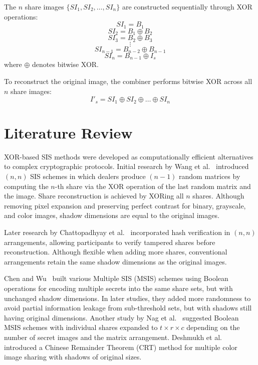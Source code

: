 The $n$ share images $\{SI_1, SI_2, \dots, SI_n\}$ are constructed sequentially through XOR operations:
\begin{equation}
SI_1 = B_1
\end{equation}
\begin{equation}
SI_2 = B_1 \oplus B_2
\end{equation}
\begin{equation}
SI_3 = B_2 \oplus B_3
\end{equation}
\begin{equation}
\vdots
\end{equation}
\begin{equation}
SI_{n-1} = B_{n-2} \oplus B_{n-1}
\end{equation}
\begin{equation}
SI_n = B_{n-1} \oplus I_s
\end{equation}
where $\oplus$ denotes bitwise XOR.

To reconstruct the original image, the combiner performs bitwise XOR across all $n$ share images:
\begin{equation}
I'_s = SI_1 \oplus SI_2 \oplus \dots \oplus SI_n
\end{equation}


\section{Literature Review}
\label{sec:lad-litreview}


XOR-based SIS methods were developed as computationally efficient alternatives to complex cryptographic protocols. Initial research by Wang et al.~\cite{wang2007} introduced $(n, n)$ SIS schemes in which dealers produce $(n-1)$ random matrices by computing the $n$-th share via the XOR operation of the last random matrix and the image. Share reconstruction is achieved by XORing all $n$ shares. Although removing pixel expansion and preserving perfect contrast for binary, grayscale, and color images, shadow dimensions are equal to the original images.

Later research by Chattopadhyay et al.~\cite{chattopadhyay2018} incorporated hash verification in $(n,n)$ arrangements, allowing participants to verify tampered shares before reconstruction. Although flexible when adding more shares, conventional arrangements retain the same shadow dimensions as the original images.

Chen and Wu~\cite{chen2014,chen2011} built various Multiple SIS (MSIS) schemes using Boolean operations for encoding multiple secrets into the same share sets, but with unchanged shadow dimensions. In later studies, they added more randomness to avoid partial information leakage from sub-threshold sets, but with shadows still having original dimensions. Another study by Nag et al.~\cite{nag2020} suggested Boolean MSIS schemes with individual shares expanded to $t \times r \times c$ depending on the number of secret images and the matrix arrangement. Deshmukh et al.~\cite{deshmukh2017} introduced a Chinese Remainder Theorem (CRT) method for multiple color image sharing with shadows of original sizes.

